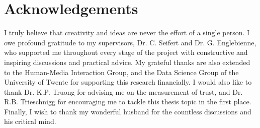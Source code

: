 \pagebreak
\hspace{0pt}
\vfill
\section*{Acknowledgements}
I truly believe that creativity and ideas are never the effort of a single person. \newline
I owe profound gratitude to my supervisors, Dr. C. Seifert and Dr. G. Englebienne, who supported me throughout every stage of the project with constructive and inspiring discussions and practical advice. My grateful thanks are also extended to the Human-Media Interaction Group, and the Data Science Group of the University of Twente for supporting this research financially. I would also like to thank Dr. K.P. Truong for advising me on the measurement of trust, and Dr. R.B. Trieschnigg for encouraging me to tackle this thesis topic in the first place. Finally, I wish to thank my wonderful husband for the countless discussions and his critical mind.\newline
\vfill
\hspace{0pt}
\pagebreak